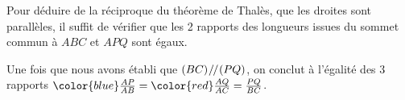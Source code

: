\documentclass[main.tex]{subfiles}
\begin{document}
\begin{remark} 
	Pour déduire de la réciproque du théorème de Thalès, que les droites sont parallèles, il suffit de vérifier que les 2 rapports des longueurs issues du sommet commun à $ABC$ et $APQ$ sont égaux. 
	
	Une fois que nous avons établi que $(BC) \mathbin{\!/\mkern-2mu/\!}  (PQ) $, on conclut à l'égalité des 3 rapports   $ { 
		{\color{blue}\frac{AP}{AB}}={\color{red}\frac{AQ}{AC}} =\frac{PQ}{BC} 
	}$. 
\end{remark}
\end{document}
